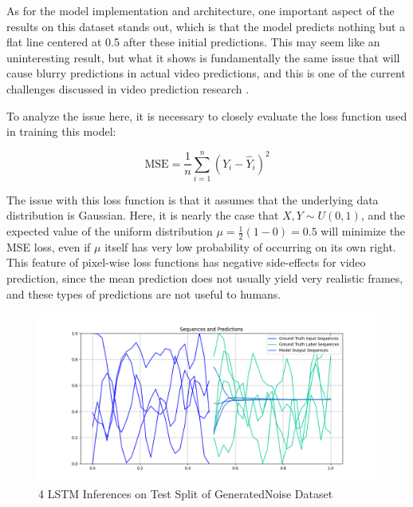 \documentclass{scrartcl}
\begin{document}
As for the model implementation and architecture, one important aspect of the
results on this dataset stands out, which is that the model predicts nothing
but a flat line centered at 0.5 after these initial predictions. This may seem
like an uninteresting result, but what it shows is fundamentally the same issue
that will cause blurry predictions in actual video predictions, and this is one
of the current challenges discussed in video prediction research
\cite{video_prediction_survey}.

To analyze the issue here, it is necessary to closely evaluate the loss
function used in training this model:

\begin{equation}
	\text{MSE} = \frac{1}{n} \sum_{i = 1}^n ( Y_i - \hat{Y}_i )^2
	 \label{eq:mseloss}
\end{equation}

The issue with this loss function is that it assumes that the underlying data
distribution is Gaussian. Here, it is nearly the case that $X, Y \sim U(0, 1)$,
and the expected value of the uniform distribution $\mu = \frac{1}{2} (1 - 0) =
0.5$ will minimize the MSE loss, even if $\mu$ itself has very low probability
of occurring on its own right. This feature of pixel-wise loss functions has
negative side-effects for video prediction, since the mean prediction does not
usually yield very realistic frames, and these types of predictions are not
useful to humans.
 
\begin{figure}[H]
	\centering
	\includegraphics[width=1\textwidth]{inferences/noise/3layer_s13.png}
	\caption{4 LSTM Inferences on Test Split of GeneratedNoise Dataset}
	\label{inf:lstm_noise_inference}
\end{figure}

\end{document}

